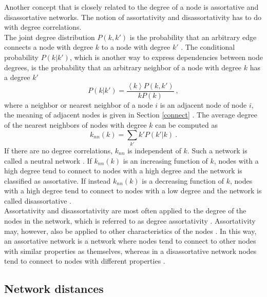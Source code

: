 \documentclass[11 pt , letterpaper , twoside , openright]{book}
\begin{document}
Another concept that is closely related to the degree of a node is assortative and disassortative networks. The notion of assortativity and disassortativity has to do with degree correlations. \\
\newline
The joint degree distribution $P(k, k')$ is the probability that an arbitrary edge connects a node with degree $k$ to a node with degree $k'$ \cite{F.Costa2007}. The conditional probability $P(k|k')$, which is another way to express dependencies between node degrees, is the probability that an arbitrary neighbor of a node with degree $k$ has a degree $k'$ 
\begin{equation}
	P(k|k') = \frac{\left<k\right>P(k, k')}{kP(k)} \ ,
\end{equation}
where a neighbor or nearest neighbor of a node $i$ is an adjacent node of node $i$, the meaning of adjacent nodes is given in Section \ref{connect} \cite{F.Costa2007}. The average degree of the nearest neighbors of nodes with degree $k$ can be computed as \cite{F.Costa2007}
\begin{equation}
	k_{nn}(k) = \sum_{k'} k'P(k'|k) \ .
\end{equation}
If there are no degree correlations, $k_{nn}$ is independent of $k$. Such a network is called a neutral network \cite{F.Costa2007}. If $k_{nn}(k)$ is an increasing function of $k$, nodes with a high degree tend to connect to nodes with a high degree and the network is classified as assortative. If instead $k_{nn}(k)$ is a decreasing function of $k$, nodes with a high degree tend to connect to nodes with a low degree and the network is called disassortative \cite{F.Costa2007}.\\
\newline
Assortativity and disassortativity are most often applied to the degree of the nodes in the network, which is referred to as degree assortativity \cite{Noldus2015}. Assortativity may, however, also be applied to other characteristics of the nodes \cite{Noldus2015}\cite{Thed2014}. In this way, an assortative network is a network where nodes tend to connect to other nodes with similar properties as themselves, whereas in a disassortative network nodes tend to connect to nodes with different properties \cite{Thed2014}.

\subsection{Network distances}
\end{document}
